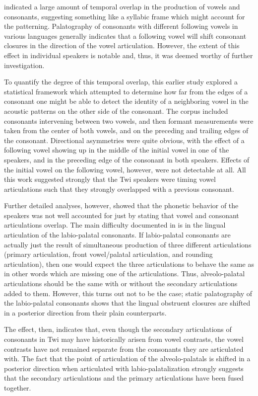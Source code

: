 \documentclass[output=paper,colorlinks,citecolor=brown]{langscibook}
\begin{document}
 indicated a large amount of temporal overlap in the production of vowels and consonants, suggesting something like a syllabic frame which might account for the patterning. Palatography  of consonants with different following vowels in various languages generally indicates that a following vowel will shift consonant closures  in the direction of the vowel articulation. However, the extent of this effect in individual speakers is notable and, thus, it was deemed worthy of further investigation. 

To quantify the degree of this temporal overlap, this earlier study explored a statistical framework which attempted to determine how far from the edges of a consonant one might be able to detect the identity of a neighboring vowel in the acoustic patterns on the other side of the consonant. The corpus included consonants intervening between two vowels, and then formant measurements were taken from the center of both vowels, and on the preceding and trailing edges of the consonant. Directional asymmetries were quite obvious, with the effect of a following vowel showing up in the middle of the initial vowel in one of the speakers, and in the preceding edge of the consonant in both speakers. Effects of the initial vowel on the following vowel, however, were not detectable at all. All this work suggested strongly that the Twi speakers were timing vowel articulations such that they strongly overlapped with a previous consonant. 

Further detailed analyses, however, showed that the phonetic behavior of the speakers was not well accounted for just by stating that vowel and consonant articulations overlap. The main difficulty documented in \citet{deJongObeng2000} is in the lingual articulation of the labio-palatal consonants. If labio-palatal consonants are actually just the result of simultaneous production of three different articulations (primary articulation, front vowel/palatal articulation, and rounding articulation), then one would expect the three articulations to behave the same as in other words which are missing one of the articulations. Thus, alveolo-palatal articulations should be the same with or without the secondary articulations added to them. However, this turns out not to be the case; static palatography of the labio-palatal consonants shows that the lingual obstruent closures are shifted in a posterior direction from their plain counterparts. 

The effect, then, indicates that, even though the secondary articulations of consonants in Twi may have historically  arisen from vowel contrasts, the vowel contrasts have not remained separate from the consonants they are articulated with. The fact that the point of articulation of the alveolo-palatals is shifted in a posterior direction when articulated with labio-palatalization strongly suggests that the secondary articulations and the primary articulations have been fused together. 
\end{document}
